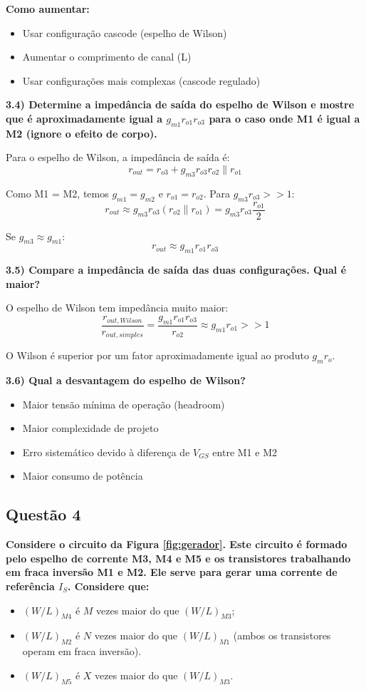 ﻿\documentclass[12pt,a4paper]{article}
\begin{document}
\textbf{Como aumentar:}
\begin{itemize}
    \item Usar configuração cascode (espelho de Wilson)
    \item Aumentar o comprimento de canal (L)
    \item Usar configurações mais complexas (cascode regulado)
\end{itemize}

\textbf{3.4) Determine a impedância de saída do espelho de Wilson e mostre que é aproximadamente igual a $g_{m1} r_{o1} r_{o3}$ para o caso onde M1 é igual a M2 (ignore o efeito de corpo).}

Para o espelho de Wilson, a impedância de saída é:
$$r_{out} = r_{o3} + g_{m3} r_{o3} r_{o2} \parallel r_{o1}$$

Como M1 = M2, temos $g_{m1} = g_{m2}$ e $r_{o1} = r_{o2}$. Para $g_{m3} r_{o3} >> 1$:
$$r_{out} \approx g_{m3} r_{o3} (r_{o2} \parallel r_{o1}) = g_{m3} r_{o3} \frac{r_{o1}}{2}$$

Se $g_{m3} \approx g_{m1}$:
$$\boxed{r_{out} \approx g_{m1} r_{o1} r_{o3}}$$

\textbf{3.5) Compare a impedância de saída das duas configurações. Qual é maior?}

O espelho de Wilson tem impedância muito maior:
$$\frac{r_{out,Wilson}}{r_{out,simples}} = \frac{g_{m1} r_{o1} r_{o3}}{r_{o2}} \approx g_{m1} r_{o1} >> 1$$

O Wilson é superior por um fator aproximadamente igual ao produto $g_m r_o$.

\textbf{3.6) Qual a desvantagem do espelho de Wilson?}

\begin{itemize}
    \item Maior tensão mínima de operação (headroom)
    \item Maior complexidade de projeto
    \item Erro sistemático devido à diferença de $V_{GS}$ entre M1 e M2
    \item Maior consumo de potência
\end{itemize}

\subsection*{Questão 4}
\textbf{Considere o circuito da Figura \ref{fig:gerador}. Este circuito é formado pelo espelho de corrente M3, M4 e M5 e os transistores trabalhando em fraca inversão M1 e M2. Ele serve para gerar uma corrente de referência $I_S$. Considere que:}
\begin{itemize}
    \item $(W/L)_{M4}$ é $M$ vezes maior do que $(W/L)_{M3}$;
    \item $(W/L)_{M2}$ é $N$ vezes maior do que $(W/L)_{M1}$ (ambos os transistores operam em fraca inversão).
    \item $(W/L)_{M5}$ é $X$ vezes maior do que $(W/L)_{M3}$.
\end{itemize}
\end{document}
